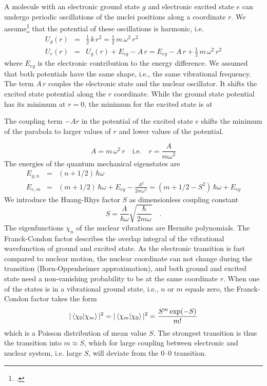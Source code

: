 A molecule with an electronic ground state $g$ and electronic excited state $e$ can undergo periodic oscillations of the nuclei positions along a coordinate $r$. We assume\footcite{Kuzmany} that the potential of these oscillations is harmonic, i.e.
\begin{eqnarray*}
 U_g(r) &=& \frac{1}{2} \, k\, r^2 = \frac{1}{2} \, m \, \omega^2 \, r^2 \\
  U_e(r) &=&  U_g(r) + E_{eg} - A \, r = E_{eg}  - A \, r + \frac{1}{2} \, m \, \omega^2 \, r^2 
 \end{eqnarray*}
where $E_{eg}$ is the electronic contribution to the energy difference. We assumed that both potentials have the same shape, i.e., the same vibrational frequency. The term $A \, r$ couples the electronic state and the nuclear oscillator. It shifts the excited state potential along the $r$ coordinate. While the ground state potential has its minimum at $r=0$, the minimum for the excited state is at
%
%
\begin{marginfigure}
   
\caption{The coupling term $-A r$ in the potential of the excited state $e$ shifts the minimum of the parabola to larger values of $r$ and lower values of the potential. }
\end{marginfigure}
%
%
\[
 A = m \, \omega^2 \,  r	 \quad \text{i.e.} \quad r = \frac{A}{m \omega^2}
\]
The energies of the quantum mechanical eigenstates are 
\begin{eqnarray*}
  E_{g, n} &=&  (n + 1/2) \, \hbar \omega  \\
  E_{e, m} &=&  (m + 1/2) \, \hbar \omega  +  E_{eg} - \frac{A^2}{2 m \omega^2} =
   (m + 1/2 - S^2) \, \hbar \omega  +  E_{eg} 
\end{eqnarray*}
We introduce the Huang-Rhys factor $S$ as dimensionless coupling constant
\[
 S = \frac{A}{\hbar \omega} \sqrt{\frac{\hbar}{2 m \omega}} \quad .
\]
The eigenfunctions $\chi_n$ of the nuclear vibrations are Hermite polynomials. The Franck-Condon factor describes the overlap integral of the vibrational wavefunction of ground and excited state. As the electronic transition is fast compared to nuclear motion, the nuclear coordinate can not change during the transition (Born-Oppenheimer approximation), and both ground and excited state need a non-vanishing probability to be at the same coordinate $r$. When one of the states is in a vibrational ground state, i.e., $n$ or $m$ equals zero, the Franck-Condon factor takes the form
\[
 | \braket{ \chi_0 | \chi_m } | ^2  =  | \braket{ \chi_m | \chi_0 } | ^2 = \frac{S^m \exp(-S)}{m!}
\]
which is a Poisson distribution of mean value $S$.  The strongest transition is thus the transition into $m \approx S$, which for large coupling between electronic and nuclear system, i.e. large $S$, will deviate from the 0--0 transition.

